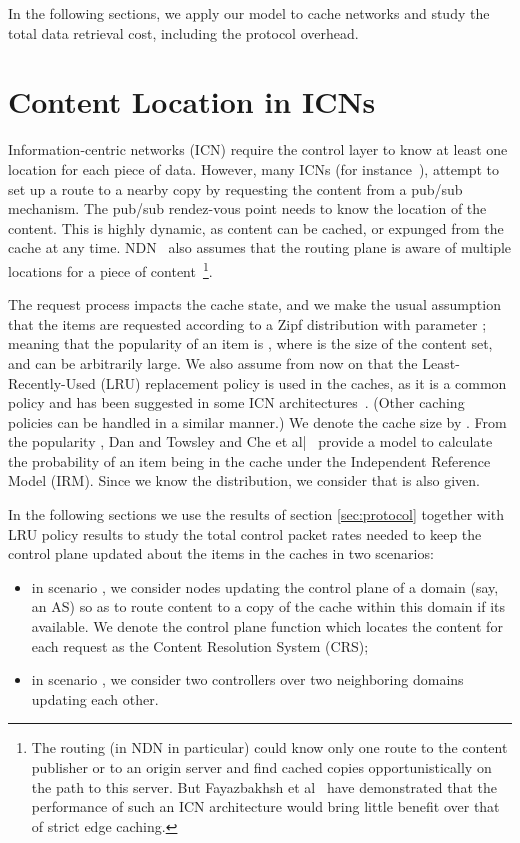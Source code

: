\documentclass[conference]{IEEEtran}
\theoremstyle{plain}
\theoremstyle{remark}
\begin{document}
In the following sections, we apply our model to cache networks and study the total data retrieval cost, including the protocol overhead.

\section{Content Location in ICNs}
\label{sec:scenarios}

Information-centric networks (ICN) require the control layer to know at least one location for each piece of data. However, many ICNs (for instance~\cite{Pursuit}), attempt to set up a route to a nearby copy by requesting the content from a pub/sub mechanism. The pub/sub rendez-vous point needs to know the location of the content. This is highly dynamic, as content can be cached, or expunged from the cache at any time. NDN~\cite{Zhang2010Named} also assumes that the routing plane is aware of multiple locations for a piece of content~\footnote{The routing (in NDN in particular) could know only one route to the content publisher or to an origin server and find cached copies opportunistically on the path to this server. But Fayazbakhsh et al~\cite{Fayazbakhsh2013Less} have demonstrated that the performance of such an ICN architecture would bring little benefit over that of strict edge caching.}.

The request process impacts the cache state, and we make the usual assumption that the items are requested according to a Zipf distribution with parameter ; meaning that the popularity of an item  is , where  is the size of the content set, and can be arbitrarily large. We also assume from now on that the Least-Recently-Used (LRU) replacement policy is used in the caches, as it is a common policy and has been suggested in some ICN architectures~\cite{Jacobson2009Networking}. (Other caching policies can be handled in a similar manner.) We denote the cache size by . From the popularity , Dan and Towsley \cite{Dan1990Approximate}  and Che et al|~\cite{Che2002Hierarchical} provide a model to calculate the probability  of an item being in the cache under the Independent Reference Model (IRM). Since we know the  distribution, we consider that  is also given.

In the following sections we use the results of section \ref{sec:protocol} together with LRU policy results to study the total control packet rates needed to keep the control plane updated about the items in the caches in two scenarios: 
\begin{itemize}
\item in scenario , we consider nodes updating the control plane of a domain (say, an AS) so as to route content to a copy of the cache within this domain if its available. We denote the control plane function which locates the content for each request as the Content Resolution System (CRS);
\item in scenario , we consider two controllers over two neighboring domains updating each other.
\end{itemize}
\end{document}
